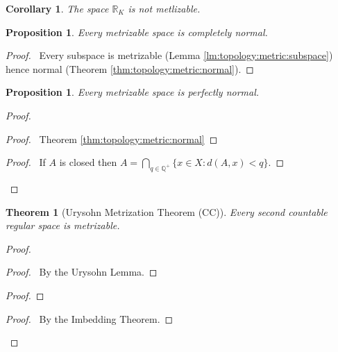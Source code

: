\documentclass{report}
\let\qed\relax
\newtheorem{prop}[lm]{Proposition}
\newtheorem{thm}[lm]{Theorem}
\newtheorem{cor}{Corollary}[lm]
\theoremstyle{definition}
\begin{document}
  \begin{cor}
    The space $\mathbb{R}_K$ is not metlizable.
  \end{cor}

    \begin{prop}
   Every metrizable space is completely normal.
  \end{prop}

  \begin{proof}
   \pf\ Every subspace is metrizable (Lemma
\ref{lm:topology:metric:subspace}) hence normal (Theorem
\ref{thm:topology:metric:normal}). \qed
  \end{proof}

   \begin{prop}
  Every metrizable space is perfectly normal.
 \end{prop}

 \begin{proof}
  \pf
  \begin{proof}
    \pf\ Theorem \ref{thm:topology:metric:normal}
  \end{proof}
  \begin{proof}
    \pf\ If $A$ is closed then $A = \bigcap_{q \in \mathbb{Q}^+} \{ x \in X :
    d(A, x) < q \}$.
  \end{proof}
  \qed
 \end{proof}

  \begin{thm}[Urysohn Metrization Theorem (CC)]
  Every second countable regular space is metrizable.
 \end{thm}

 \begin{proof}
  \pf
  \begin{proof}
    \pf\ By the Urysohn Lemma.
  \end{proof}
  \begin{proof}
  \end{proof}
\begin{proof}
  \pf\ By the Imbedding Theorem.
\end{proof}
\qedstep
 \end{proof}
\end{document}
